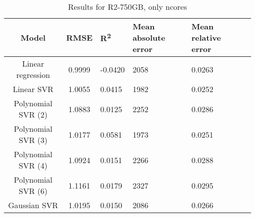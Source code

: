 \begin{table}[H]
\centering
\begin{adjustbox}{center}
\begin{tabular}{c | c M{1.2cm} M{2.5cm} M{2.5cm} M{1.8cm}}
Model & RMSE & R\textsuperscript{2} & Mean absolute error & Mean relative error \tabularnewline
\hline
Linear regression & 0.9999 & -0.0420 &   2058 & 0.0263 \\
Linear SVR & 1.0055 & 0.0415 &   1982 & 0.0252 \\
Polynomial SVR (2) & 1.0883 & 0.0125 &   2252 & 0.0286 \\
Polynomial SVR (3) & 1.0177 & 0.0581 &   1973 & 0.0251 \\
Polynomial SVR (4) & 1.0924 & 0.0151 &   2266 & 0.0288 \\
Polynomial SVR (6) & 1.1161 & 0.0179 &   2327 & 0.0295 \\
Gaussian SVR & 1.0195 & 0.0150 &   2086 & 0.0266 \\
\end{tabular}
\end{adjustbox}
\\
\caption{Results for R2-750GB, only ncores}
\label{tab:only_1_linear_R2_750}
\end{table}
